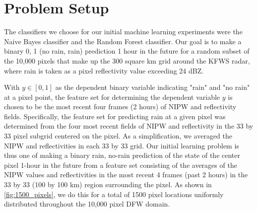 \documentclass[proposal]{umassthesis}
\begin{document}
\section{Problem Setup}
The classifiers we choose for our initial machine learning experiments were the Naive Bayes classifier and the Random Forest classifier. Our goal is to make a binary 0, 1 (no rain, rain) prediction 1 hour in the future for a random subset of the 10,000 pixels that make up the 300 square km grid around the KFWS radar, where rain is taken as a pixel reflectivity value exceeding 24 dBZ.
 
With $y\in[0,1]$ as the dependent binary variable indicating "rain" and "no rain" at a pixel point, the feature set for determining the dependent variable $y$ is chosen to be the most recent four frames (2 hours) of NIPW and reflectivity fields. Specifically, the feature set for predicting rain at a given pixel was determined from the four most recent fields of NIPW and reflectivity in the 33 by 33 pixel subgrid centered on the pixel. As a simplification, we averaged the NIPW and reflectivities in each 33 by 33 grid. Our initial learning problem is thus one of making a binary rain, no-rain prediction of the state of the center pixel 1-hour in the future from a feature set consisting of the averages of the NIPW values and reflectivities in the most recent 4 frames (past 2 hours) in the 33 by 33 (100 by 100 km) region surrounding the pixel. As shown in \ref{fig:1500_pixels}, we do this for a total of 1500 pixel locations uniformly distributed throughout the 10,000 pixel DFW domain.
\end{document}

